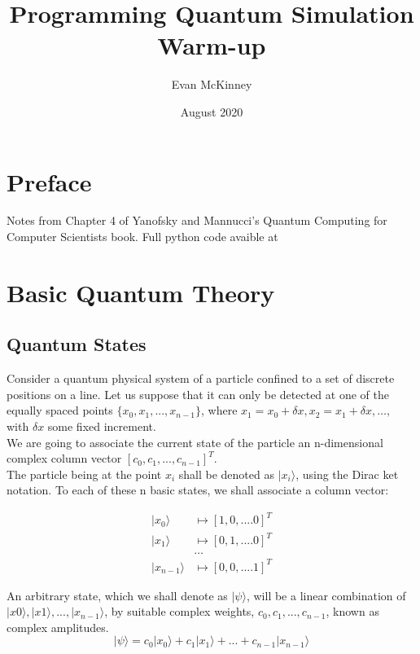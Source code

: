 \documentclass{article}
\title{Programming Quantum Simulation Warm-up}
\author{Evan McKinney }
\date{August 2020}
\begin{document}
\maketitle

\section*{Preface}
Notes from Chapter 4 of Yanofsky and Mannucci's Quantum Computing for Computer Scientists book. Full python code avaible at
\href{https://github.com/evmckinney9/QuantumDrill4}{\color{blue}{https://github.com/evmckinney9/QuantumDrill4}}

\section{Basic Quantum Theory}
\subsection{Quantum States}

Consider a quantum physical system of a particle confined to a set of discrete positions on a line. Let us suppose that it can only be detected at one of the equally spaced points
$\{x_{0}, x_{1}, ..., x_{n-1}\}$, where $x_{1} = x_{0} + \delta x, x_{2} = x_{1} + \delta x, \ldots,$ with $\delta x$ some fixed increment.\\

We are going to associate the current state of the particle an n-dimensional complex column vector $[c_{0}, c_{1}, ..., c_{n-1}]^T$.\\

The particle being at the point $x_{i}$ shall be denoted as $|x_{i}\rangle$, using the Dirac ket notation. To each of these n basic states, we shall associate a column vector:

\begin{equation}
\begin{aligned}
    |x_{0}\rangle &\longmapsto [1,0, ....0]^T\\
    |x_{1}\rangle &\longmapsto [0,1, ....0]^T\\
    &\ldots\\
    |x_{n-1}\rangle &\longmapsto [0,0, ....1]^T
\end{aligned}
\end{equation}


An arbitrary state, which we shall denote as $|\psi\rangle$, will be a linear combination of $|x0\rangle, |x1\rangle, ..., |x_{n-1}\rangle$, by suitable complex weights, $c_{0}, c_{1}, ..., c_{n-1}$, known as complex amplitudes.
\begin{equation}
    	|\psi\rangle = c_{0}|x_{0}\rangle + c_{1}|x_{1}\rangle + ... + c_{n-1}|x_{n-1}\rangle
\end{equation}
\end{document}
